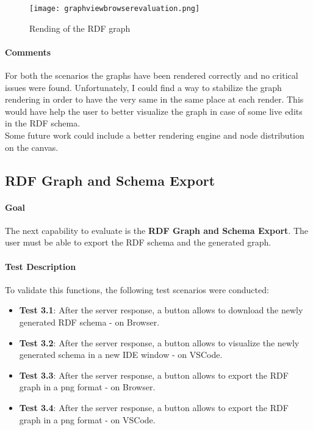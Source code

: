 \begin{figure}[htb]
    \centering
    \texttt{[image: graphviewbrowserevaluation.png]}
    \caption{Rending of the RDF graph}
    \label{fig:rendergraph}
\end{figure}

\paragraph{Comments}
For both the scenarios the graphs have been rendered correctly and no critical issues were found.
Unfortunately, I could find a way to stabilize the graph rendering in order to have the very same in the same place at each render. This would have help the user to better visualize the graph in case of some live edits in the RDF schema. 
\\
Some future work could include a better rendering engine and node distribution on the canvas.

\subsection{RDF Graph and Schema Export}

\paragraph{Goal}
The next capability to evaluate is the \textbf{RDF Graph and Schema Export}. The user must be able to export the RDF schema and the generated graph.

\paragraph{Test Description}
To validate this functions, the following test scenarios were conducted:
\begin{itemize}
    \item \textbf{Test 3.1}: After the server response, a button allows to download the newly generated RDF schema - on Browser. 
    \item \textbf{Test 3.2}: After the server response, a button allows to visualize the newly generated schema in a new IDE window - on VSCode. 
    \item \textbf{Test 3.3}: After the server response, a button allows to export the RDF graph in a png format - on Browser. 
    \item \textbf{Test 3.4}: After the server response, a button allows to export the RDF graph in a png format - on VSCode. 
\end{itemize}


